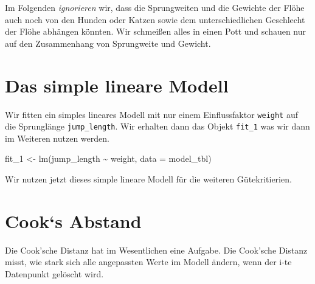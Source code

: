 \documentclass[
  letterpaper,
]{scrbook}
\newenvironment{Shaded}{\begin{snugshade}}{\end{snugshade}}
\newcommand{\AttributeTok}[1]{\textcolor[rgb]{0.40,0.45,0.13}{#1}}
\newcommand{\FunctionTok}[1]{\textcolor[rgb]{0.28,0.35,0.67}{#1}}
\newcommand{\NormalTok}[1]{\textcolor[rgb]{0.00,0.23,0.31}{#1}}
\newcommand{\OtherTok}[1]{\textcolor[rgb]{0.00,0.23,0.31}{#1}}
\newcommand{\SpecialCharTok}[1]{\textcolor[rgb]{0.37,0.37,0.37}{#1}}
\begin{document}
Im Folgenden \emph{ignorieren} wir, dass die Sprungweiten und die
Gewichte der Flöhe auch noch von den Hunden oder Katzen sowie dem
unterschiedlichen Geschlecht der Flöhe abhängen könnten. Wir schmeißen
alles in einen Pott und schauen nur auf den Zusammenhang von Sprungweite
und Gewicht.

\hypertarget{das-simple-lineare-modell-1}{%
\section{Das simple lineare Modell}\label{das-simple-lineare-modell-1}}

Wir fitten ein simples lineares Modell mit nur einem Einflussfaktor
\texttt{weight} auf die Sprunglänge \texttt{jump\_length}. Wir erhalten
dann das Objekt \texttt{fit\_1} was wir dann im Weiteren nutzen werden.

\begin{Shaded}
\begin{Highlighting}[]
\NormalTok{fit\_1 }\OtherTok{\textless{}{-}} \FunctionTok{lm}\NormalTok{(jump\_length }\SpecialCharTok{\textasciitilde{}}\NormalTok{ weight, }\AttributeTok{data =}\NormalTok{ model\_tbl)}
\end{Highlighting}
\end{Shaded}

Wir nutzen jetzt dieses simple lineare Modell für die weiteren
Gütekritierien.

\hypertarget{cooks-abstand}{%
\section{Cook`s Abstand}\label{cooks-abstand}}

Die Cook'sche Distanz hat im Wesentlichen eine Aufgabe. Die Cook'sche
Distanz misst, wie stark sich alle angepassten Werte im Modell ändern,
wenn der i-te Datenpunkt gelöscht wird.
\end{document}
